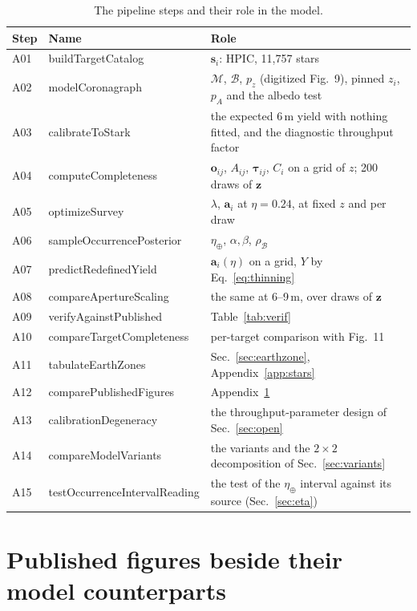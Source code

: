\documentclass[11pt,a4paper]{article}
\begin{document}
\begin{table}[htbp]
\centering
\small
\begin{tabular}{llp{8.6cm}}
\toprule
\textbf{Step} & \textbf{Name} & \textbf{Role} \\
\midrule
A01 & buildTargetCatalog & $\mathbf{s}_i$: HPIC, 11,757 stars \\
A02 & modelCoronagraph & $\mathcal{M}$, $\mathcal{B}$, $p_z$ (digitized Fig.~9), pinned $z_i$, $p_A$ and the albedo test \\
A03 & calibrateToStark & the expected 6\,m yield with nothing fitted, and the diagnostic throughput factor \\
A04 & computeCompleteness & $\mathbf{o}_{ij}$, $A_{ij}$, $\boldsymbol{\tau}_{ij}$, $C_i$ on a grid of $z$; 200 draws of $\mathbf{z}$ \\
A05 & optimizeSurvey & $\lambda$, $\mathbf{a}_i$ at $\eta = 0.24$, at fixed $z$ and per draw \\
A06 & sampleOccurrencePosterior & $\eta_\oplus$, $\alpha,\beta$, $\rho_\mathcal{B}$ \\
A07 & predictRedefinedYield & $\mathbf{a}_i(\eta)$ on a grid, $Y$ by Eq.~\eqref{eq:thinning} \\
A08 & compareApertureScaling & the same at 6--9\,m, over draws of $\mathbf{z}$ \\
A09 & verifyAgainstPublished & Table~\ref{tab:verif} \\
A10 & compareTargetCompleteness & per-target comparison with Fig.~11 \\
A11 & tabulateEarthZones & Sec.~\ref{sec:earthzone}, Appendix~\ref{app:stars} \\
A12 & comparePublishedFigures & Appendix~\ref{app:pairs} \\
A13 & calibrationDegeneracy & the throughput-parameter design of Sec.~\ref{sec:open} \\
A14 & compareModelVariants & the variants and the $2\times2$ decomposition of Sec.~\ref{sec:variants} \\
A15 & testOccurrenceIntervalReading & the test of the $\eta_\oplus$ interval against its source (Sec.~\ref{sec:eta}) \\
\bottomrule
\end{tabular}
\caption{The pipeline steps and their role in the model.}
\label{tab:steps}
\end{table}

\appendix
\section{Published figures beside their model counterparts}
\label{app:pairs}
\end{document}
